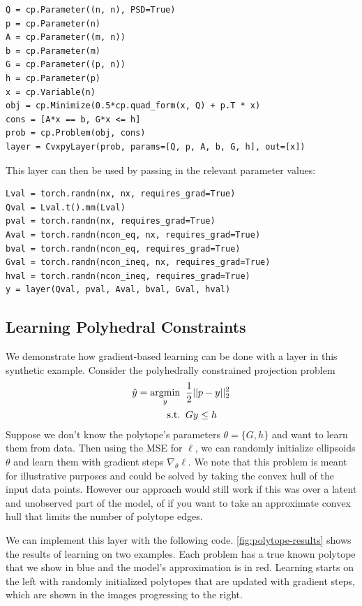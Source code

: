 \begin{lstlisting}
Q = cp.Parameter((n, n), PSD=True)
p = cp.Parameter(n)
A = cp.Parameter((m, n))
b = cp.Parameter(m)
G = cp.Parameter((p, n))
h = cp.Parameter(p)
x = cp.Variable(n)
obj = cp.Minimize(0.5*cp.quad_form(x, Q) + p.T * x)
cons = [A*x == b, G*x <= h]
prob = cp.Problem(obj, cons)
layer = CvxpyLayer(prob, params=[Q, p, A, b, G, h], out=[x])
\end{lstlisting}

This layer can then be used by passing in the
relevant parameter values:
\begin{lstlisting}
Lval = torch.randn(nx, nx, requires_grad=True)
Qval = Lval.t().mm(Lval)
pval = torch.randn(nx, requires_grad=True)
Aval = torch.randn(ncon_eq, nx, requires_grad=True)
bval = torch.randn(ncon_eq, requires_grad=True)
Gval = torch.randn(ncon_ineq, nx, requires_grad=True)
hval = torch.randn(ncon_ineq, requires_grad=True)
y = layer(Qval, pval, Aval, bval, Gval, hval)
\end{lstlisting}

\newpage
\subsection{Learning Polyhedral Constraints}
We demonstrate how gradient-based learning can be done with
a \cvxpy layer in this synthetic example.
Consider the polyhedrally constrained
projection problem
\begin{align*}
\hat y = \operatorname*{argmin}_y\;\; &\frac{1}{2}||p-y||_2^2  \\
 {\rm s.t.}\;\; & Gy\leq h \\
\end{align*}
Suppose we don't know the polytope's parameters $\theta=\{G, h\}$
and want to learn them from data.
Then using the MSE for $\ell$, we can randomly initialize
ellipsoids $\theta$ and learn them with gradient steps $\nabla_\theta \ell$.
We note that this problem is meant for illustrative purposes and
could be solved by taking the convex hull of the input data points.
However our approach would still work if this was over a latent
and unobserved part of the model, of if you want to take an
approximate convex hull that limits the number of polytope edges.

We can implement this layer with the following code.
\cref{fig:polytope-results} shows the results of learning
on two examples.
Each problem has a true known polytope that we show in blue
and the model's approximation is in red.
Learning starts on the left with randomly initialized
polytopes that are updated with gradient steps,
which are shown in the images progressing to the right.

